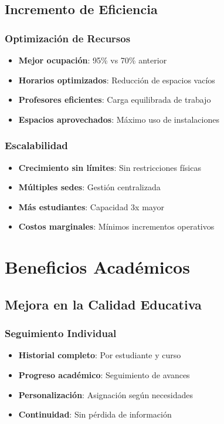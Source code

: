 \documentclass[12pt,a4paper]{article}
\begin{document}
\subsection{Incremento de Eficiencia}

\subsubsection{Optimización de Recursos}
\begin{itemize}
    \item \textbf{Mejor ocupación}: 95\% vs 70\% anterior
    \item \textbf{Horarios optimizados}: Reducción de espacios vacíos
    \item \textbf{Profesores eficientes}: Carga equilibrada de trabajo
    \item \textbf{Espacios aprovechados}: Máximo uso de instalaciones
\end{itemize}

\subsubsection{Escalabilidad}
\begin{itemize}
    \item \textbf{Crecimiento sin límites}: Sin restricciones físicas
    \item \textbf{Múltiples sedes}: Gestión centralizada
    \item \textbf{Más estudiantes}: Capacidad 3x mayor
    \item \textbf{Costos marginales}: Mínimos incrementos operativos
\end{itemize}

\section{Beneficios Académicos}

\subsection{Mejora en la Calidad Educativa}

\subsubsection{Seguimiento Individual}
\begin{itemize}
    \item \textbf{Historial completo}: Por estudiante y curso
    \item \textbf{Progreso académico}: Seguimiento de avances
    \item \textbf{Personalización}: Asignación según necesidades
    \item \textbf{Continuidad}: Sin pérdida de información
\end{itemize}
\end{document}
